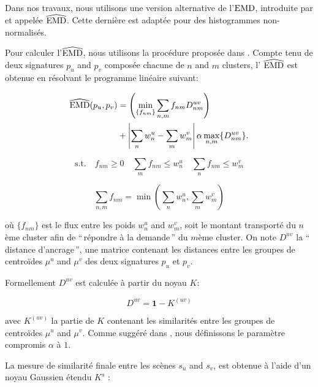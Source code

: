 Dans nos travaux, nous utilisons une version alternative de l'$\mathrm{EMD}$, introduite par \citep{pele2008linear} et appelée $\widehat{\mathrm{EMD}}$. Cette dernière est adaptée pour des histogrammes non-normalisés.

Pour calculer l'$\widehat{\mathrm{EMD}}$, nous utilisons la procédure proposée dans \citep{pele2009fast}. Compte tenu de deux signatures $p_u$ and $p_v$ composée chacune de $n$ and $m$ clusters, l' $\widehat{\mathrm{EMD}}$ est obtenue en résolvant le programme linéaire suivant:

\begin{equation}
\begin{split}
\widehat{\mathrm{EMD}}(p_u,p_v) &=\left( \min\limits_{\lbrace f_{nm}\rbrace} \sum\limits_{n,m} f_{nm}D_{nm}^{uv} \right) \\
&+ \left|\sum\limits_{n} w_n^u - \sum\limits_{m} w_m^v  \right| \alpha \max\limits_{n,m}\lbrace  D_{nm}^{uv}\rbrace.
\end{split}
\end{equation}

\begin{equation*}
\mathrm{s.t.} \quad f_{nm}\geq0 \quad \sum\limits_{m} f_{nm} \leq w_n^u \quad \sum\limits_{n} f_{nm} \leq w_m^v
\end{equation*}

\begin{equation*}
\sum\limits_{n,m}f_{nm} = \min\left( \sum\limits_{n} w_n^u ,\sum\limits_{m} w_m^v \right)
\end{equation*} 

où  $\lbrace f_{nm} \rbrace$ est le flux entre les poids $w_n^u$ and $w_m^v$, soit le montant transporté du $n$ème cluster afin de  ``\,répondre à la demande\,'' du $m$ème cluster. On note $D^{uv}$ la ``\,distance d'ancrage\,'', une matrice contenant les distances entre les groupes de centroïdes  $\mu^u$ and $\mu^v$ des deux signatures $p_u$ et $p_v$. 

Formellement $D^{uv}$ est calculée à partir du noyau $K$:

\begin{equation}
D^{uv}=\boldsymbol{1}-K^{(uv)}
\end{equation}

avec $K^{(uv)}$ la partie de $K$ contenant les similarités  entre les groupes de centroïdes $\mu^u$ and $\mu^v$. Comme suggéré dans \citep{pele2009fast}, nous définissons le paramètre compromis $\alpha$ à $1$.

La mesure de similarité finale entre les scènes $s_u$ and $s_v$,  est obtenue à l'aide d'un noyau Gaussien étendu $K^s$  \citep{chapelle1999support,jing2003support}:

